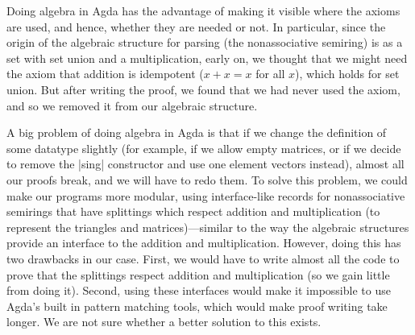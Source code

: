 Doing algebra in Agda has the advantage of making it visible where the axioms are used, and hence, whether they are needed or not. In particular, since the origin of the algebraic structure for parsing (the nonassociative semiring) is as a set with set union and a multiplication, early on, we thought that we might need the axiom that addition is idempotent ($x + x = x$ for all $x$), which holds for set union. But after writing the proof, we found that we had never used the axiom, and so we removed it from our algebraic structure.

A big problem of doing algebra in Agda is that if we change the definition of some datatype slightly (for example, if we allow empty matrices, or if we decide to remove the |sing| constructor and use one element vectors instead), almost all our proofs break, and we will have to redo them. To solve this problem, we could make our programs more modular, using interface-like records for nonassociative semirings that have splittings which respect addition and multiplication (to represent the triangles and matrices)---similar to the way the algebraic structures provide an interface to the addition and multiplication. However, doing this has two drawbacks in our case. First, we would have to write almost all the code to prove that the splittings respect addition and multiplication (so we gain little from doing it). Second, using these interfaces would make it impossible to use Agda's built in pattern matching tools, which would make proof writing take longer. We are not sure whether a better solution to this exists.
